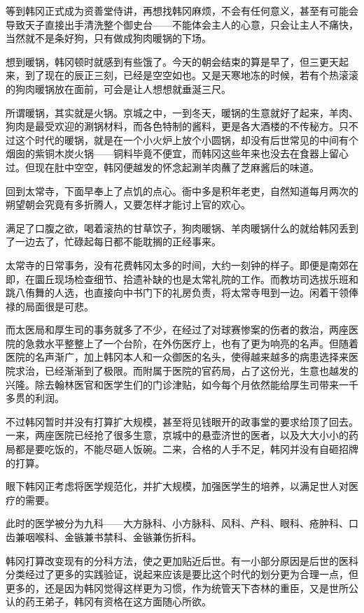 等到韩冈正式成为资善堂侍讲，再想找韩冈麻烦，不会有任何意义，甚至有可能会导致天子直接出手清洗整个御史台——不能体会主人的心意，只会让主人不痛快，当然就不是条好狗，只有做成狗肉暖锅的下场。

想到暖锅，韩冈顿时就感到有些饿了。今天的朝会结束的算是早了，但三更天起来，到了现在的辰正三刻，已经是空空如也。又是天寒地冻的时候，若有个热滚滚的狗肉暖锅放在面前，可会是让人想想就垂涎三尺。

所谓暖锅，其实就是火锅。京城之中，一到冬天，暖锅的生意就好了起来，羊肉、狗肉是最受欢迎的涮锅材料，而各色特制的酱料，更是各大酒楼的不传秘方。只不过这个时代的暖锅，就是在一个小火炉上放个小圆锅，却没有后世常见的中间有个烟囱的紫铜木炭火锅——铜料毕竟不便宜，而韩冈这些年来也没去在食器上留心过。但现在肚中空空，韩冈便越发的怀念起涮羊肉蘸了芝麻酱后的味道。

回到太常寺，下面早奉上了点饥的点心。衙中多是积年老吏，自然知道每月两次的朔望朝会究竟有多折腾人，又要怎样才能讨上官的欢心。

满足了口腹之欲，喝着滚热的甘草饮子，狗肉暖锅、羊肉暖锅什么的就给韩冈丢到了一边去了，忙碌起每日都不能耽搁的正经事来。

太常寺的日常事务，没有花费韩冈太多的时间，大约一刻钟的样子。即便是南郊在即，在圜丘现场检查细节、拾遗补缺的也是太常礼院的工作。而教坊司选拔乐班和跳八侑舞的人选，也直接向中书门下的礼房负责，将太常寺甩到一边。闲着干领俸禄的局面很是可悲。

而太医局和厚生司的事务就多了不少，在经过了对球赛惨案的伤者的救治，两座医院的急救水平整整上了一个台阶，在外伤医疗上，也有了更为响亮的名声。但随着医院的名声渐广，加上韩冈本人和一众御医的名头，使得越来越多的病患选择来医院求治，已经渐渐到了极限。而附属于医院的官药局，占了这份光，生意也越发的兴隆。除去翰林医官和医学生们的门诊津贴，如今每个月依然能给厚生司带来一千多贯的利润。

不过韩冈暂时并没有打算扩大规模，甚至将见钱眼开的政事堂的要求给顶了回去。一来，两座医院已经抢了很多生意，京城中的悬壶济世的医者，以及大大小小的药局都是要吃饭的，不能尽砸人饭碗。二来，合格的人手不足，韩冈并没有自砸招牌的打算。

眼下韩冈正考虑将医学规范化，并扩大规模，加强医学生的培养，以满足世人对医疗的需要。

此时的医学被分为九科——大方脉科、小方脉科、风科、产科、眼科、疮肿科、口齿兼咽喉科、金镞兼书禁科、金镞兼伤折科。

韩冈打算改变现有的分科方法，使之更加贴近后世。有一小部分原因是后世的医科分类经过了更多的实践验证，说起来应该是要比这个时代的划分更为合理一点，但更多的，还是因为韩冈觉得这样更为习惯，作为统管天下杏林的重臣，又是世所公认的药王弟子，韩冈有资格在这方面随心所欲。

